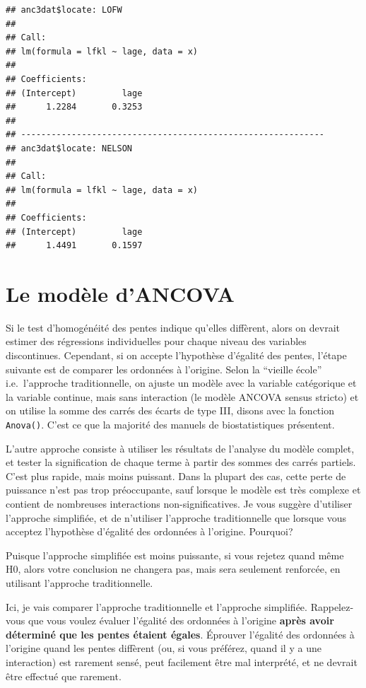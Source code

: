 \documentclass[12pt,]{book}
\begin{document}
\begin{verbatim}
## anc3dat$locate: LOFW        
## 
## Call:
## lm(formula = lfkl ~ lage, data = x)
## 
## Coefficients:
## (Intercept)         lage  
##      1.2284       0.3253  
## 
## ------------------------------------------------------------ 
## anc3dat$locate: NELSON      
## 
## Call:
## lm(formula = lfkl ~ lage, data = x)
## 
## Coefficients:
## (Intercept)         lage  
##      1.4491       0.1597
\end{verbatim}

\hypertarget{le-moduxe8le-dancova}{%
\section{Le modèle d'ANCOVA}\label{le-moduxe8le-dancova}}

Si le test d'homogénéité des pentes indique qu'elles diffèrent, alors on devrait estimer des régressions individuelles pour chaque niveau des variables discontinues. Cependant, si on accepte l'hypothèse d'égalité des pentes, l'étape suivante est de comparer les ordonnées à l'origine. Selon la ``vieille école'' i.e.~l'approche traditionnelle, on ajuste un modèle avec la variable catégorique et la variable continue, mais sans interaction (le modèle ANCOVA sensus stricto) et on utilise la somme des carrés des écarts de type III, disons avec la fonction \texttt{Anova()}. C'est ce que la majorité des manuels de biostatistiques présentent.

L'autre approche consiste à utiliser les résultats de l'analyse du modèle complet, et tester la signification de chaque terme à partir des sommes des carrés partiels. C'est plus rapide, mais moins puissant. Dans la plupart des cas, cette perte de puissance n'est pas trop préoccupante, sauf lorsque le modèle est très complexe et contient de nombreuses interactions non-significatives. Je vous suggère d'utiliser l'approche simplifiée, et de n'utiliser l'approche traditionnelle que lorsque vous acceptez l'hypothèse d'égalité des ordonnées à l'origine. Pourquoi?

Puisque l'approche simplifiée est moins puissante, si vous rejetez quand même H0, alors votre conclusion ne changera pas, mais sera seulement renforcée, en utilisant l'approche traditionnelle.

Ici, je vais comparer l'approche traditionnelle et l'approche simplifiée. Rappelez-vous que vous voulez évaluer l'égalité des ordonnées à l'origine \textbf{après avoir déterminé que les pentes étaient égales}. Éprouver l'égalité des ordonnées à l'origine quand les pentes diffèrent (ou, si vous préférez, quand il y a une interaction) est rarement sensé, peut facilement être mal interprété, et ne devrait être effectué que rarement.
\end{document}
